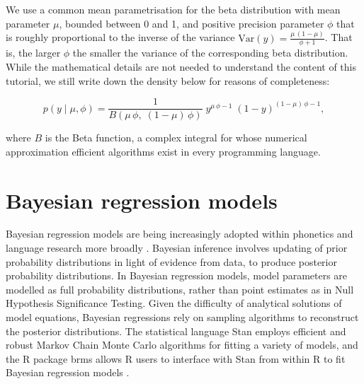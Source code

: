 \documentclass[
  authoryear,
  preprint,
  3p]{elsarticle}
\begin{document}
We use a common mean parametrisation for the beta distribution with mean
parameter \(\mu\), bounded between 0 and 1, and positive precision
parameter \(\phi\) that is roughly proportional to the inverse of the
variance \(\text{Var}(y) = \frac{\mu \, (1 - \mu)}{\phi + 1}\). That is,
the larger \(\phi\) the smaller the variance of the corresponding beta
distribution. While the mathematical details are not needed to
understand the content of this tutorial, we still write down the density
below for reasons of completeness:

\[
p(y \mid \mu, \phi) = \frac{1}{B(\mu \, \phi, \; (1-\mu) \, \phi)} \; y^{\mu \, \phi -1} \; (1-y)^{(1-\mu) \, \phi -1},
\]

where \(B\) is the Beta function, a complex integral for whose numerical
approximation efficient algorithms exist in every programming language.

\section{Bayesian regression models}\label{sec-bayes}

Bayesian regression models are being increasingly adopted within
phonetics and language research more broadly
\citep{vasishth2018, nalborczyk2019, verissimo2021}. Bayesian inference
involves updating of prior probability distributions in light of
evidence from data, to produce posterior probability distributions. In
Bayesian regression models, model parameters are modelled as full
probability distributions, rather than point estimates as in Null
Hypothesis Significance Testing. Given the difficulty of analytical
solutions of model equations, Bayesian regressions rely on sampling
algorithms to reconstruct the posterior distributions. The statistical
language Stan \citep{standevelopmentteam2017} employs efficient and
robust Markov Chain Monte Carlo algorithms for fitting a variety of
models, and the R package brms allows R users to interface with Stan
from within R to fit Bayesian regression models
\citep{burkner2017, burkner2018, burkner2021}.
\end{document}
